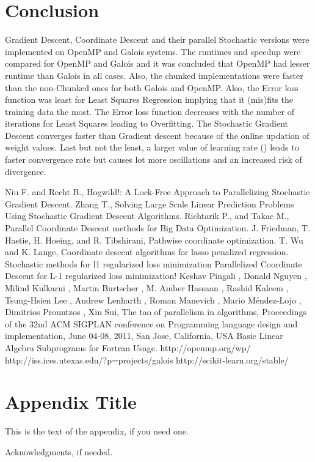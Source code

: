 \documentclass{sigplanconf}
\begin{document}
\section{Conclusion}
Gradient Descent, Coordinate Descent and their parallel Stochastic versions were implemented on OpenMP and Galois systems. The runtimes and speedup
were compared for OpenMP and Galois and it was concluded that OpenMP had lesser runtime than Galois in all cases. Also, the chunked implementations
were faster than the non-Chunked ones for both Galois and OpenMP. Also, the Error loss function was least for Least Squares Regression implying that it
(mis)fits the training data the most. The Error loss function decreases with the number of iterations for Least Squares leading to Overfitting. The Stochastic
Gradient Descent converges faster than Gradient descent because of the online updation of weight values. Last but not the least, a larger value of learning
rate (\eta) leads to faster convergence rate but causes lot more oscillations and an increased risk of divergence.



\begin{thebibliography}{}
\softraggedright

Niu F. and Recht B., Hogwild!: A Lock-Free Approach to Parallelizing Stochastic Gradient Descent.
Zhang T., Solving Large Scale Linear Prediction Problems Using Stochastic Gradient Descent Algorithms.
Richtarik P., and Takac M., Parallel Coordinate Descent methods for Big Data Optimization.
J. Friedman, T. Hastie, H. Hoeing, and R. Tibshirani, Pathwise coordinate optimization.
T. Wu and K. Lange, Coordinate descent algorithms for lasso penalized regression.
Stochastic methods for l1 regularized loss minimization
Parallelized Coordinate Descent for L-1 regularized loss minimization!
Keshav Pingali , Donald Nguyen , Milind Kulkarni , Martin Burtscher , M. Amber Hassaan , Rashid
Kaleem , Tsung-Hsien Lee , Andrew Lenharth , Roman Manevich , Mario Méndez-Lojo , Dimitrios
Prountzos , Xin Sui, The tao of parallelism in algorithms, Proceedings of the 32nd ACM SIGPLAN
conference on Programming language design and implementation, June 04-08, 2011, San Jose,
California, USA
Basic Linear Algebra Subprograms for Fortran Usage.
http://openmp.org/wp/
http://iss.ices.utexas.edu/?p=projects/galois
http://scikit-learn.org/stable/

\end{thebibliography}

\appendix

\section{Appendix Title}

This is the text of the appendix, if you need one.

\acks

Acknowledgments, if needed.
\end{document}

